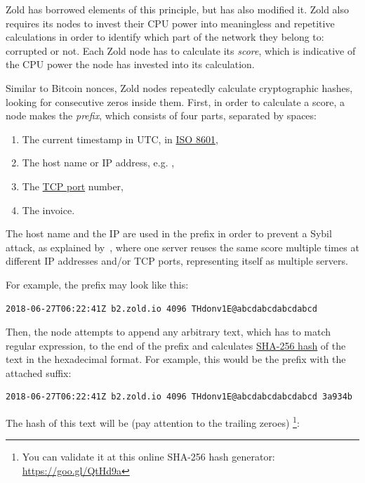 \documentclass{main}
\begin{document}
Zold has borrowed elements of this principle, but has also modified it. Zold also requires
its nodes to invest their CPU power into meaningless and repetitive
calculations in order to identify which part of the network they belong to:
corrupted or not. Each Zold node has to calculate its \emph{score},
which is indicative of the CPU power the node has invested into its calculation.

Similar to Bitcoin nonces, Zold nodes repeatedly calculate cryptographic hashes,
looking for consecutive zeros inside them. First, in order to calculate a score,
a node makes the \emph{prefix}, which consists of four parts,
separated by spaces:

\begin{enumerate}
\item The current timestamp in UTC, in \href{https://en.wikipedia.org/wiki/ISO_8601}{ISO 8601},
\item The host name or IP address, e.g. ,
\item The \href{https://en.wikipedia.org/wiki/Port_(computer_networking)}{TCP port} number,
\item The invoice.
\end{enumerate}

The host name and the IP are used in the prefix in order to prevent a Sybil attack,
as explained by~\textcite{douceur2002},
where one server reuses the same score multiple times at different IP addresses
and/or TCP ports, representing itself as multiple servers.

For example, the prefix may look like this:

\begin{verbatim}
2018-06-27T06:22:41Z b2.zold.io 4096 THdonv1E@abcdabcdabcdabcd
\end{verbatim}

Then, the node attempts to append any arbitrary text, which has to match
\dd{/[a-zA-Z0-9]+/} regular expression, to the end of the prefix and calculates
\href{https://en.wikipedia.org/wiki/SHA-2}{SHA-256 hash}
of the text in the hexadecimal format. For example, this would be the prefix
with the attached  suffix:

\begin{verbatim}
2018-06-27T06:22:41Z b2.zold.io 4096 THdonv1E@abcdabcdabcdabcd 3a934b
\end{verbatim}

The hash of this text will be (pay attention to the trailing zeroes)%
\footnote{You can validate it at this online SHA-256 hash generator:
\url{https://goo.gl/QtHd9a}}:
\end{document}
